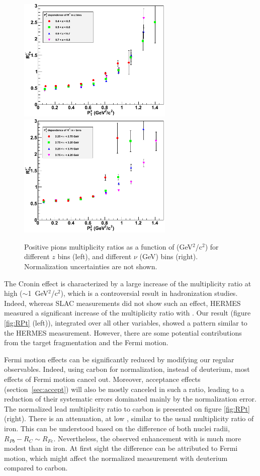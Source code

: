 \begin{figure}[p]
\centering
\includegraphics[width=7.4cm] {chap6-fig/F_RvPtinZ.png} 
\includegraphics[width=7.4cm] {chap6-fig/F_RvPtinNu.png} 
\caption {Positive pions multiplicity ratios as a function of \pt (GeV$^2$/c$^2$) for different $z$ bins (left), and different $\nu$ (GeV) bins (right). Normalization uncertainties are not shown.}
\label{fig:RPtMulti}
\end{figure}

The Cronin effect is characterized by a large increase of the multiplicity 
ratio at high \pt ($\sim$1~GeV$^2$/c$^2$), which is a controversial result in hadronization studies. Indeed, whereas SLAC measurements 
\cite{Osborne:1978ai} did not show such an effect, HERMES \cite{Airapetian:2007vu} measured a significant increase of the multiplicity 
ratio with \ptp. Our result (figure \ref{fig:RPt} (left)), integrated over 
all other variables, showed a pattern similar to the HERMES measurement. 
However, there are some potential contributions from the target fragmentation and 
the Fermi motion.

Fermi motion effects can be significantly reduced by modifying our regular observables. Indeed, using carbon for normalization, instead of deuterium, most effects of Fermi motion cancel out. Moreover, acceptance effects (section~\ref{sec:accept}) will also be mostly canceled in such a ratio, leading to a reduction of their systematic errors dominated mainly by the normalization error. The normalized lead multiplicity ratio to carbon is presented on figure \ref{fig:RPt} (right). There is an attenuation, at low \ptp, similar to the usual multiplicity ratio of iron. This can be understood based on the difference of both nuclei radii, $R_{Pb}-R_{C} \sim R_{Fe}$. Nevertheless, the observed enhancement with \pt is much more modest than in iron. At first sight the difference can be attributed to Fermi motion, which might affect the normalized measurement with deuterium compared to carbon.

